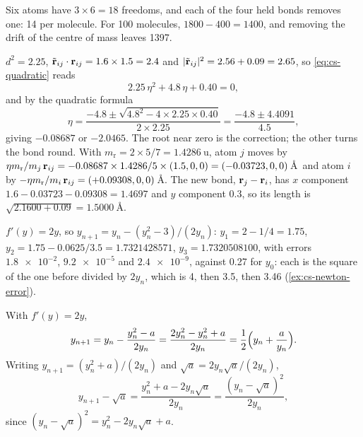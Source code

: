 \label{sec:cs-solutions}

Six atoms have $3\times6 = 18$ freedoms, and
each of the four held bonds removes one: 14 per molecule. For 100
molecules, $1800 - 400 = 1400$, and removing the drift of the centre of
mass leaves 1397.

$d^2 = 2.25$, $\tilde{\bm{\mathrm{r}}}_{ij}\cdot
\bm{\mathrm{r}}_{ij} = 1.6\times1.5 = 2.4$ and $\lvert\tilde{\bm{\mathrm{r}}}_{ij}\rvert^2
= 2.56 + 0.09 = 2.65$, so \cref{eq:cs-quadratic} reads
\begin{equation*}
   2.25\,\eta^2 + 4.8\,\eta + 0.40 = 0 ,
\end{equation*}
and by the quadratic formula
\begin{equation*}
   \eta = \frac{-4.8 \pm \sqrt{4.8^2 - 4\times2.25\times0.40}}{2\times2.25}
   = \frac{-4.8 \pm 4.4091}{4.5} ,
\end{equation*}
giving $-0.08687$ or $-2.0465$. The root near zero is the correction;
the other turns the bond round. With $m_{\mathrm r} = 2\times5/7 =
\SI{1.4286}{\amu}$, atom $j$ moves by $\eta m_{\mathrm r}/m_j\,
\bm{\mathrm{r}}_{ij} = -0.08687\times1.4286/5\times(1.5, 0, 0) = (-0.03723, 0,
0)$\,\AA\ and atom $i$ by $-\eta m_{\mathrm r}/m_i\,\bm{\mathrm{r}}_{ij} =
(+0.09308, 0, 0)$\,\AA. The new bond, $\bm{\mathrm{r}}_j - \bm{\mathrm{r}}_i$, has $x$
component $1.6 - 0.03723 - 0.09308 = 1.4697$ and $y$ component 0.3, so
its length is $\sqrt{2.1600 + 0.09} = \SI{1.5000}{\angstrom}$.

$f'(y) = 2y$, so $y_{n+1} = y_n - (y_n^2 -
3)/(2y_n)$: $y_1 = 2 - 1/4 = 1.75$, $y_2 = 1.75 - 0.0625/3.5 =
1.7321428571$, $y_3 = 1.7320508100$, with errors $\num{1.8e-2}$,
$\num{9.2e-5}$ and $\num{2.4e-9}$, against 0.27 for $y_0$: each is the
square of the one before divided by $2y_n$, which is 4, then 3.5, then
3.46 (\cref{ex:cs-newton-error}).

With $f'(y) = 2y$,
\begin{equation*}
   y_{n+1} = y_n - \frac{y_n^2 - a}{2y_n} = \frac{2y_n^2 - y_n^2 + a}{2y_n}
   = \frac12\Bigl(y_n + \frac{a}{y_n}\Bigr) .
\end{equation*}
Writing $y_{n+1} = (y_n^2 + a)/(2y_n)$ and $\sqrt a = 2y_n\sqrt
a/(2y_n)$,
\begin{equation*}
   y_{n+1} - \sqrt a = \frac{y_n^2 + a - 2y_n\sqrt a}{2y_n}
   = \frac{(y_n - \sqrt a)^2}{2y_n} ,
\end{equation*}
since $(y_n - \sqrt a)^2 = y_n^2 - 2y_n\sqrt a + a$.

